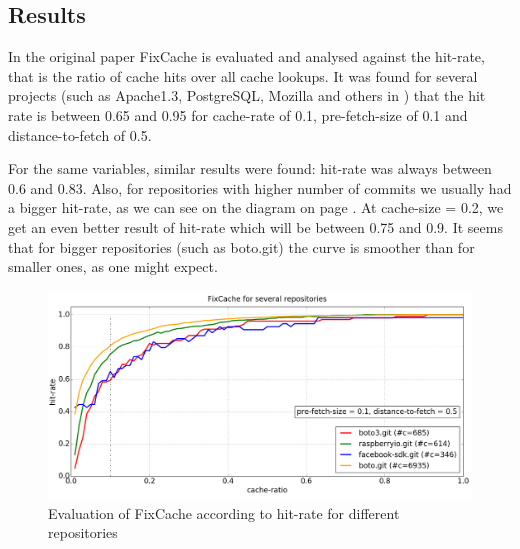 \documentclass[12pt,twoside,notitlepage]{report}
\newcommand{\fxch}{FixCache}
\begin{document}
\subsection{Results}
In the original paper \fxch{} is evaluated and analysed against the hit-rate, that is the ratio of cache hits over all cache lookups. It was found for several projects (such as Apache1.3, PostgreSQL, Mozilla and others in \cite{FixCache}) that the hit rate is between 0.65 and 0.95 for cache-rate of 0.1, pre-fetch-size of 0.1 and distance-to-fetch of 0.5.

For the same variables, similar results were found: hit-rate was always between 0.6 and 0.83. Also, for repositories with higher number of commits we usually had a bigger hit-rate, as we can see on the diagram on page \pageref{fig:v5_repos}. At cache-size = 0.2, we get an even better result of hit-rate which will be between 0.75 and 0.9. It seems that for bigger repositories (such as boto.git) the curve is smoother than for smaller ones, as one might expect.
\begin{figure}[th!]
\includegraphics[width=1.0\textwidth]{plot_several.png}
\caption{Evaluation of \fxch{} according to hit-rate for different repositories}
\label{fig:v5_repos}
\end{figure}
\end{document}
